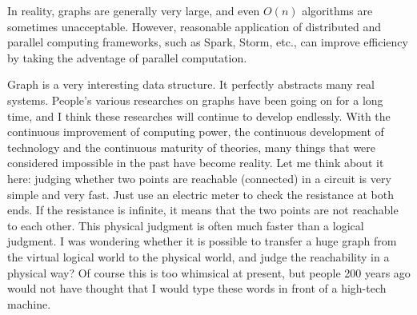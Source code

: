 \documentclass[11pt]{article}
\begin{document}
In reality, graphs are generally very large, and even $O(n)$ algorithms are sometimes unacceptable. However, reasonable application of distributed and parallel computing frameworks, such as Spark, Storm, etc., can improve efficiency by taking the adventage of parallel computation.

Graph is a very interesting data structure. It perfectly abstracts many real systems. People's various researches on graphs have been going on for a long time, and I think these researches will continue to develop endlessly. With the continuous improvement of computing power, the continuous development of technology and the continuous maturity of theories, many things that were considered impossible in the past have become reality. Let me think about it here: judging whether two points are reachable (connected) in a circuit is very simple and very fast. Just use an electric meter to check the resistance at both ends. If the resistance is infinite, it means that the two points are not reachable to each other. This physical judgment is often much faster than a logical judgment. I was wondering whether it is possible to transfer a huge graph from the virtual logical world to the physical world, and judge the reachability in a physical way? Of course this is too whimsical at present, but people 200 years ago would not have thought that I would type these words in front of a high-tech machine.
\newpage
\end{document}
